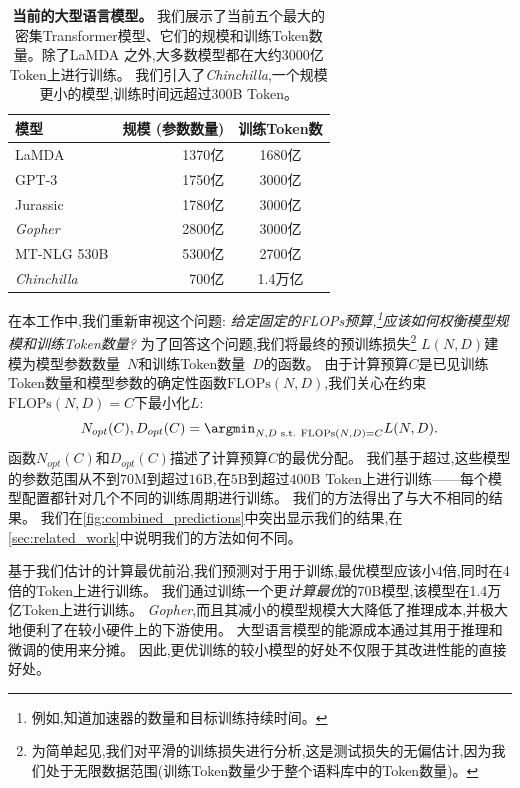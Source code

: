 \documentclass[11pt, a4paper, logo, copyright, nonumbering]{deepmind}
\newcommand{\gopher}{\textit{Gopher}\xspace}
\newcommand{\nummodels}{400 }
\newcommand{\chinchilla}{\textit{Chinchilla}\xspace}
\newcommand{\mtnlg}{MT-NLG 530B\xspace}
\begin{document}
\begin{table}[t]
    \caption{\textbf{当前的大型语言模型。}
    我们展示了当前五个最大的密集Transformer模型、它们的规模和训练Token数量。除了LaMDA \citep{thoppilan2022lamda}之外,大多数模型都在大约3000亿Token上进行训练。
    我们引入了\chinchilla,一个规模更小的模型,训练时间远超过300B Token。
    }
    \label{tab:llms}
\centering
\begin{tabular}{l r c}
\toprule
模型 & 规模 (参数数量) & 训练Token数 \\
\midrule
LaMDA \citep{thoppilan2022lamda} & 1370亿 & 1680亿 \\
GPT-3 \citep{gpt3} & 1750亿 & 3000亿 \\
Jurassic \citep{jurassic} & 1780亿 & 3000亿 \\
\gopher \citep{rae2021gopher} & 2800亿 & 3000亿 \\
\mtnlg \citep{nlg530b} & 5300亿 & 2700亿\\
\midrule
\chinchilla & 700亿 & 1.4万亿\\
\bottomrule
\end{tabular}
\end{table}

在本工作中,我们重新审视这个问题:
\textit{给定固定的FLOPs预算,\footnote{例如,知道加速器的数量和目标训练持续时间。}应该如何权衡模型规模和训练Token数量?}
为了回答这个问题,我们将最终的预训练损失\footnote{
为简单起见,我们对平滑的训练损失进行分析,这是测试损失的无偏估计,因为我们处于无限数据范围(训练Token数量少于整个语料库中的Token数量)。}
$L(N, D)$建模为模型参数数量~$N$和训练Token数量~$D$的函数。
由于计算预算$C$是已见训练Token数量和模型参数的确定性函数$\text{FLOPs}(N,D)$,我们关心在约束$\text{FLOPs}(N, D) = C$下最小化$L$:
% 
\begin{equation}\label{eq:model}
    N_{opt}(C), D_{opt}(C) = \argmin_{N, D \text{ s.t. } \text{FLOPs}(N, D) = C} L(N, D).
\end{equation}
% 
函数$N_{opt}(C)$和$D_{opt}(C)$描述了计算预算$C$的最优分配。
我们基于超过,这些模型的参数范围从不到$70$M到超过$16$B,在$5$B到超过$400$B Token上进行训练——每个模型配置都针对几个不同的训练周期进行训练。
我们的方法得出了与\citet{kaplan2020scaling}大不相同的结果。
我们在\autoref{fig:combined_predictions}中突出显示我们的结果,在\autoref{sec:related_work}中说明我们的方法如何不同。

基于我们估计的计算最优前沿,我们预测对于用于训练,最优模型应该小4倍,同时在4倍的Token上进行训练。
我们通过训练一个更\textit{计算最优}的70B模型,该模型在1.4万亿Token上进行训练。
\gopher,而且其减小的模型规模大大降低了推理成本,并极大地便利了在较小硬件上的下游使用。
大型语言模型的能源成本通过其用于推理和微调的使用来分摊。
因此,更优训练的较小模型的好处不仅限于其改进性能的直接好处。
\end{document}
